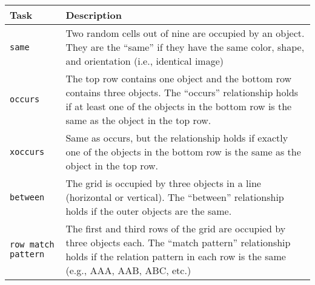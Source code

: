\begin{tabular}{p{}p{}}
    \toprule
    Task              & Description                                                                                                                                                                                             \\ \midrule
    \texttt{same}              & Two random cells out of nine are occupied by an object. They are the ``same'' if they have the same color, shape, and orientation (i.e., identical image)                                               \\\hline
    \texttt{occurs}            & The top row contains one object and the bottom row contains three objects. The ``occurs'' relationship holds if at least one of the objects in the bottom row is the same as the object in the top row. \\\hline
    \texttt{xoccurs}           & Same as occurs, but the relationship holds if exactly one of the objects in the bottom row is the same as the object in the top row.                                                                    \\\hline
    \texttt{between}           & The grid is occupied by three objects in a line (horizontal or vertical). The ``between'' relationship holds if the outer objects are the same.                                                         \\\hline
    \texttt{row match pattern} & The first and third rows of the grid are occupied by three objects each. The ``match pattern'' relationship holds if the relation pattern in each row is the same (e.g., AAA, AAB, ABC, etc.)           \\ \bottomrule
\end{tabular}
